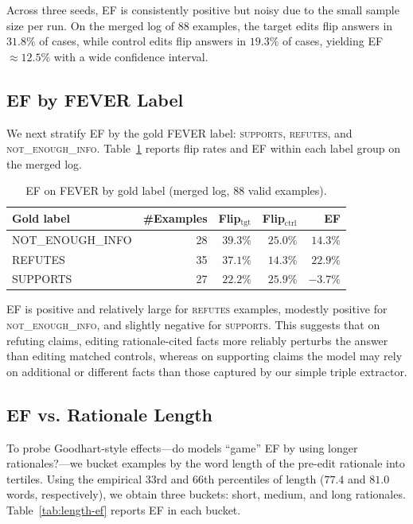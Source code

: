 \documentclass[11pt]{article}
\begin{document}
Across three seeds, EF is consistently positive but noisy due to the small sample size per run. On the merged log of 88 examples, the target edits flip answers in $31.8\%$ of cases, while control edits flip answers in $19.3\%$ of cases, yielding EF $\approx 12.5\%$ with a wide confidence interval.

\subsection*{EF by FEVER Label}

We next stratify EF by the gold FEVER label: \textsc{supports}, \textsc{refutes}, and \textsc{not\_enough\_info}. Table~\ref{tab:label-ef} reports flip rates and EF within each label group on the merged log.

\begin{table}[h]
  \centering
  \caption{EF on FEVER by gold label (merged log, 88 valid examples).}
  \label{tab:label-ef}
  \begin{tabular}{lrrrr}
    \toprule
    Gold label & \#Examples & Flip$_{\text{tgt}}$ & Flip$_{\text{ctrl}}$ & EF \\
    \midrule
    NOT\_ENOUGH\_INFO & 28 & $39.3\%$ & $25.0\%$ & $14.3\%$ \\
    REFUTES           & 35 & $37.1\%$ & $14.3\%$ & $22.9\%$ \\
    SUPPORTS          & 27 & $22.2\%$ & $25.9\%$ & $-3.7\%$ \\
    \bottomrule
  \end{tabular}
\end{table}

EF is positive and relatively large for \textsc{refutes} examples, modestly positive for \textsc{not\_enough\_info}, and slightly negative for \textsc{supports}. This suggests that on refuting claims, editing rationale-cited facts more reliably perturbs the answer than editing matched controls, whereas on supporting claims the model may rely on additional or different facts than those captured by our simple triple extractor.

\subsection*{EF vs. Rationale Length}

To probe Goodhart-style effects---do models ``game'' EF by using longer rationales?---we bucket examples by the word length of the pre-edit rationale into tertiles. Using the empirical $33$rd and $66$th percentiles of length ($77.4$ and $81.0$ words, respectively), we obtain three buckets: short, medium, and long rationales. Table~\ref{tab:length-ef} reports EF in each bucket.
\end{document}
